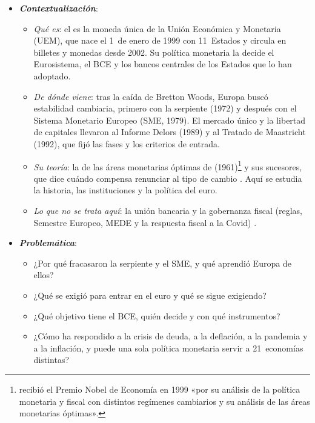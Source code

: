 \documentclass[11pt]{article}
\begin{document}
\begin{itemize}
\item \textbf{\emph{Contextualización}}:
  \begin{itemize}
  \item \emph{Qué es}: el  es la moneda única de la Unión Económica y Monetaria (UEM), que nace el 1~de enero de 1999 con 11~Estados y circula en billetes y monedas desde 2002. Su política monetaria la decide el Eurosistema, el BCE y los bancos centrales de los Estados que lo han adoptado.
  \item \emph{De dónde viene}: tras la caída de Bretton Woods, Europa buscó estabilidad cambiaria, primero con la serpiente (1972) y después con el Sistema Monetario Europeo (SME, 1979). El mercado único y la libertad de capitales llevaron al Informe Delors (1989) y al Tratado de Maastricht (1992), que fijó las fases y los criterios de entrada.
  \item \emph{Su teoría}: la de las áreas monetarias óptimas de  (1961)\footnote{ recibió el Premio Nobel de Economía en 1999 «por su análisis de la política monetaria y fiscal con distintos regímenes cambiarios y su análisis de las áreas monetarias óptimas»\nocite{Nobel1999Mundell}.} y sus sucesores, que dice cuándo compensa renunciar al tipo de cambio . Aquí se estudia la historia, las instituciones y la política del euro.
  \item \emph{Lo que no se trata aquí}: la unión bancaria  y la gobernanza fiscal (reglas, Semestre Europeo, MEDE y la respuesta fiscal a la Covid) .
  \end{itemize}

\item \textbf{\emph{Problemática}}:
  \begin{itemize}
  \item ¿Por qué fracasaron la serpiente y el SME, y qué aprendió Europa de ellos?
  \item ¿Qué se exigió para entrar en el euro y qué se sigue exigiendo?
  \item ¿Qué objetivo tiene el BCE, quién decide y con qué instrumentos?
  \item ¿Cómo ha respondido a la crisis de deuda, a la deflación, a la pandemia y a la inflación, y puede una sola política monetaria servir a 21~economías distintas?
  \end{itemize}


\end{itemize}
\end{document}
